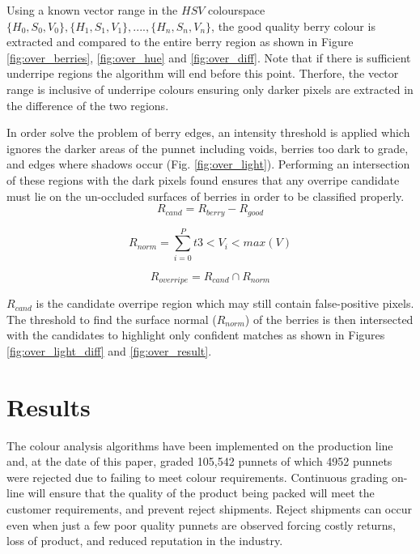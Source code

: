 \documentclass[fleqn,twoside,12pt]{report}
\begin{document}
Using a known vector range in the $HSV$ colourspace $\{H_0, S_0, V_0\}, \{H_1, S_1, V_1\},....,\{H_n, S_n, V_n\}$, the good quality berry colour is  extracted and compared to the entire berry region as shown in Figure \ref{fig:over_berries}, \ref{fig:over_hue} and \ref{fig:over_diff}. Note that if there is sufficient underripe regions the algorithm will end before this point. Therfore, the vector range is inclusive of underripe colours ensuring only darker pixels are extracted in the difference of the two regions.

In order solve the problem of berry edges, an intensity threshold is applied which ignores the darker areas of the punnet including voids, berries too dark to grade, and edges where shadows occur (Fig. \ref{fig:over_light}). Performing an intersection of these regions with the dark pixels found ensures that any overripe candidate must lie on the un-occluded surfaces of berries in order to be classified properly. 
\begin{equation}
R_{cand} = R_{berry} - R_{good}
\label{diff_berry_hue}
\end{equation}

\begin{equation}
R_{norm} = \sum_{i=0}^{P}t3<V_i<max(V)
\label{berry_tops}
\end{equation}

\begin{equation}
R_{overripe} = R_{cand} \cap R_{norm}
\label{intersect_dark_berry}
\end{equation}

$R_{cand}$ is the candidate overripe region which may still contain false-positive pixels. The threshold to find the surface normal ($R_{norm}$) of the berries is then intersected with the candidates to highlight only confident matches as shown in Figures \ref{fig:over_light_diff} and \ref{fig:over_result}.


\section{Results}


The colour analysis algorithms have been implemented on the production line and, at the date of this paper, graded 105,542 punnets of which 4952 punnets were rejected due to failing to meet colour requirements. Continuous grading on-line will ensure that the quality of the product being packed will meet the customer requirements, and prevent reject shipments. Reject shipments can occur even when just a few poor quality punnets are observed forcing costly returns, loss of product, and reduced reputation in the industry.
\end{document}
